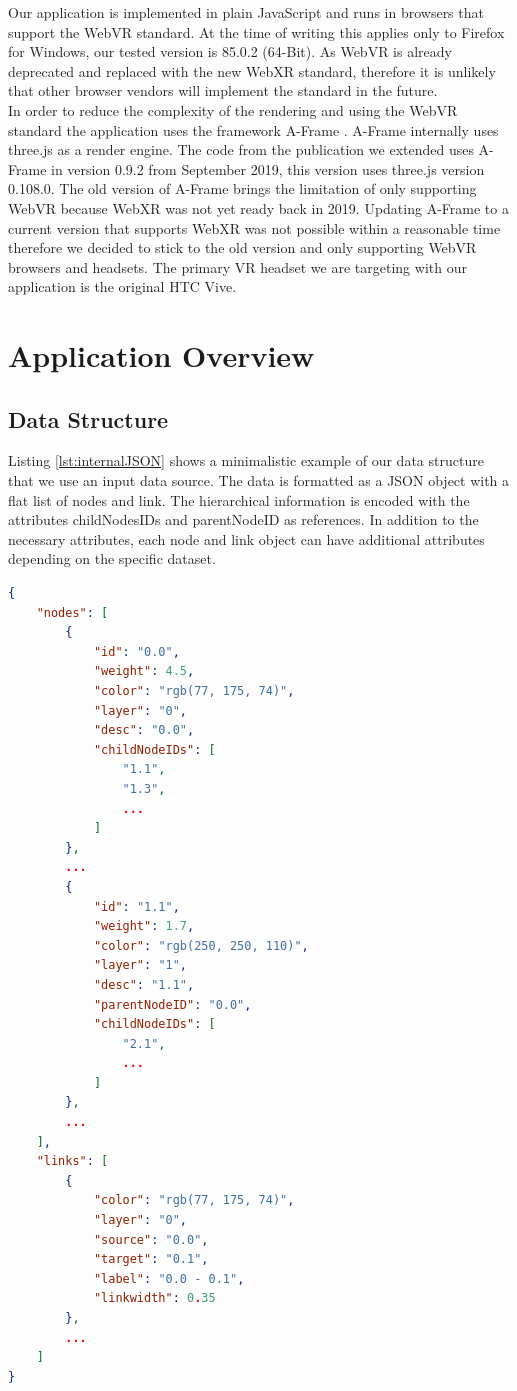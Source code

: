Our application is implemented in plain JavaScript and runs in browsers that support the WebVR standard. 
At the time of writing this applies only to Firefox for Windows, our tested version is 85.0.2 (64-Bit). 
As WebVR is already deprecated and replaced with the new WebXR standard, therefore it is unlikely that other browser vendors will implement the standard in the future.\\
In order to reduce the complexity of the rendering and using the WebVR standard the application uses the framework A-Frame \cite{aframe}. A-Frame internally uses three.js \cite{threejs} as a render engine. The code from the publication we extended uses A-Frame in version 0.9.2 from September 2019, this version uses three.js version 0.108.0. 
The old version of A-Frame brings the limitation of only supporting WebVR because WebXR was not yet ready back in 2019. 
Updating A-Frame to a current version that supports WebXR was not possible within a reasonable time therefore we decided to stick to the old version and only supporting WebVR browsers and headsets.
The primary VR headset we are targeting with our application is the original HTC Vive.

\section{Application Overview}

\subsection{Data Structure}

Listing \ref{lst:internalJSON} shows a minimalistic example of our data structure that we use an input data source. The data is formatted as a JSON object with a flat list of nodes and link. The hierarchical information is encoded with the attributes childNodesIDs and parentNodeID as references. 
In addition to the necessary attributes, each node and link object can have additional attributes depending on the specific dataset.

\begin{lstlisting}[language=json,label={lst:internalJSON},caption=minimal JSON input data structure]
{
    "nodes": [
        {
            "id": "0.0",
            "weight": 4.5,
            "color": "rgb(77, 175, 74)",
            "layer": "0",
            "desc": "0.0",
            "childNodeIDs": [
                "1.1",
                "1.3",
                ...
            ]
        },
        ...
        {
            "id": "1.1",
            "weight": 1.7,
            "color": "rgb(250, 250, 110)",
            "layer": "1",
            "desc": "1.1",
            "parentNodeID": "0.0",
            "childNodeIDs": [
                "2.1",
                ...
            ]
        },
        ...
    ],
    "links": [
        {
            "color": "rgb(77, 175, 74)",
            "layer": "0",
            "source": "0.0",
            "target": "0.1",
            "label": "0.0 - 0.1",
            "linkwidth": 0.35
        },
        ...
    ]
}
\end{lstlisting}

